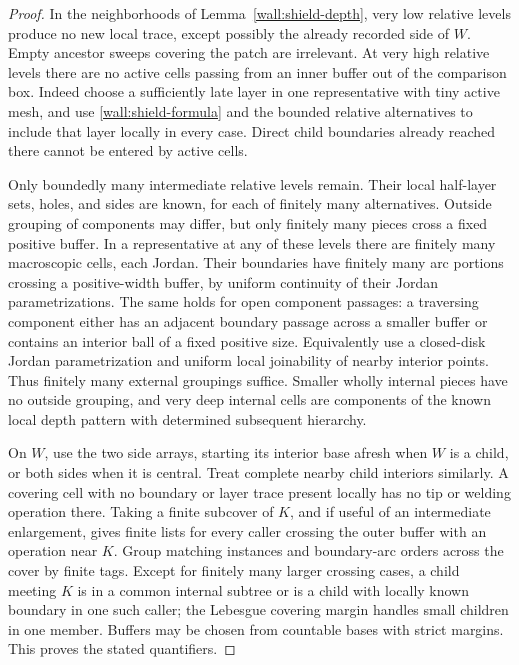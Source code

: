 \begin{proof}
In the neighborhoods of Lemma~\ref{wall:shield-depth}, very low relative levels produce no new local trace, except possibly the already recorded side of $W$.  Empty ancestor sweeps covering the patch are irrelevant.  At very high relative levels there are no active cells passing from an inner buffer out of the comparison box.  Indeed choose a sufficiently late layer in one representative with tiny active mesh, and use \eqref{wall:shield-formula} and the bounded relative alternatives to include that layer locally in every case.  Direct child boundaries already reached there cannot be entered by active cells.

Only boundedly many intermediate relative levels remain.  Their local half-layer sets, holes, and sides are known, for each of finitely many alternatives.  Outside grouping of components may differ, but only finitely many pieces cross a fixed positive buffer.  In a representative at any of these levels there are finitely many macroscopic cells, each Jordan.  Their boundaries have finitely many arc portions crossing a positive-width buffer, by uniform continuity of their Jordan parametrizations.  The same holds for open component passages: a traversing component either has an adjacent boundary passage across a smaller buffer or contains an interior ball of a fixed positive size.  Equivalently use a closed-disk Jordan parametrization and uniform local joinability of nearby interior points.  Thus finitely many external groupings suffice.  Smaller wholly internal pieces have no outside grouping, and very deep internal cells are components of the known local depth pattern with determined subsequent hierarchy.

On $W$, use the two side arrays, starting its interior base afresh when $W$ is a child, or both sides when it is central.  Treat complete nearby child interiors similarly.  A covering cell with no boundary or layer trace present locally has no tip or welding operation there.  Taking a finite subcover of $K$, and if useful of an intermediate enlargement, gives finite lists for every caller crossing the outer buffer with an operation near $K$.  Group matching instances and boundary-arc orders across the cover by finite tags.  Except for finitely many larger crossing cases, a child meeting $K$ is in a common internal subtree or is a child with locally known boundary in one such caller; the Lebesgue covering margin handles small children in one member.  Buffers may be chosen from countable bases with strict margins.  This proves the stated quantifiers.
\end{proof}

